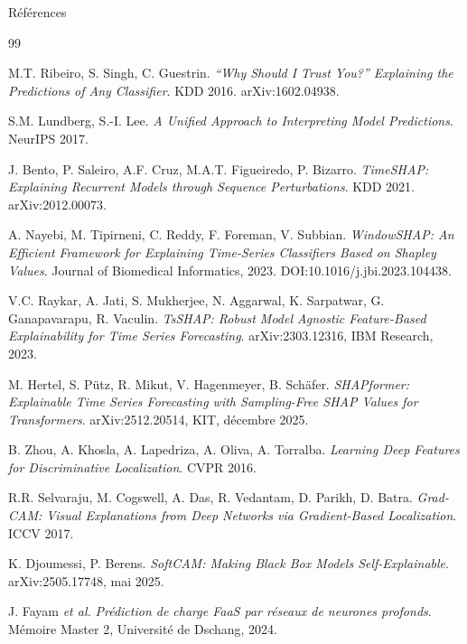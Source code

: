 \documentclass[10pt]{beamer}
\begin{document}
\begin{frame}[allowframebreaks]{Références}
  \scriptsize
  \begin{thebibliography}{99}

      M.T. Ribeiro, S. Singh, C. Guestrin.
      \textit{``Why Should I Trust You?'' Explaining the Predictions of Any Classifier}.
      KDD 2016. arXiv:1602.04938.

      S.M. Lundberg, S.-I. Lee.
      \textit{A Unified Approach to Interpreting Model Predictions}.
      NeurIPS 2017.

      J. Bento, P. Saleiro, A.F. Cruz, M.A.T. Figueiredo, P. Bizarro.
      \textit{TimeSHAP: Explaining Recurrent Models through Sequence Perturbations}.
      KDD 2021. arXiv:2012.00073.

      A. Nayebi, M. Tipirneni, C. Reddy, F. Foreman, V. Subbian.
      \textit{WindowSHAP: An Efficient Framework for Explaining Time-Series Classifiers
      Based on Shapley Values}.
      Journal of Biomedical Informatics, 2023. DOI:10.1016/j.jbi.2023.104438.

      V.C. Raykar, A. Jati, S. Mukherjee, N. Aggarwal, K. Sarpatwar,
      G. Ganapavarapu, R. Vaculin.
      \textit{TsSHAP: Robust Model Agnostic Feature-Based Explainability for
      Time Series Forecasting}.
      arXiv:2303.12316, IBM Research, 2023.

      M. Hertel, S. Pütz, R. Mikut, V. Hagenmeyer, B. Schäfer.
      \textit{SHAPformer: Explainable Time Series Forecasting with Sampling-Free
      SHAP Values for Transformers}.
      arXiv:2512.20514, KIT, décembre 2025.

      B. Zhou, A. Khosla, A. Lapedriza, A. Oliva, A. Torralba.
      \textit{Learning Deep Features for Discriminative Localization}.
      CVPR 2016.

      R.R. Selvaraju, M. Cogswell, A. Das, R. Vedantam, D. Parikh, D. Batra.
      \textit{Grad-CAM: Visual Explanations from Deep Networks via
      Gradient-Based Localization}.
      ICCV 2017.

      K. Djoumessi, P. Berens.
      \textit{SoftCAM: Making Black Box Models Self-Explainable}.
      arXiv:2505.17748, mai 2025.

      J. Fayam \textit{et al.}
      \textit{Prédiction de charge FaaS par réseaux de neurones profonds}.
      Mémoire Master 2, Université de Dschang, 2024.

  \end{thebibliography}
\end{frame}

\end{document}
